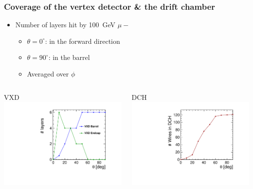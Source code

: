 \documentclass[aspectratio=169, hyperref={colorlinks=true,pdfpagelabels=false,linkcolor=black}, xcolor=dvipsnames,10pt]{beamer}
\begin{document}
\begin{frame}
	\frametitle{Coverage of the vertex detector \& the drift chamber}
	
	\begin{itemize}
		\item Number of layers hit by 100~GeV $\mu-$ 
		\begin{itemize}

		\item $\theta=0^{\circ}$: in the forward direction
		\item $\theta=90^{\circ}$: in the barrel
		\item Averaged over $\phi$	
		\end{itemize}
	\end{itemize}
		
	\begin{columns}	
		\begin{block}{VXD}
		\centering
		\includegraphics[width=\textwidth]{../figures/theta_nbHits_VXD.pdf}
		\end{block}
	
		\begin{block}{DCH}
		\centering
		\includegraphics[width=\textwidth]{../figures/theta_nbHits_DCH.pdf} 	
		\end{block}
	\end{columns}
	

\end{frame}
\end{document}
